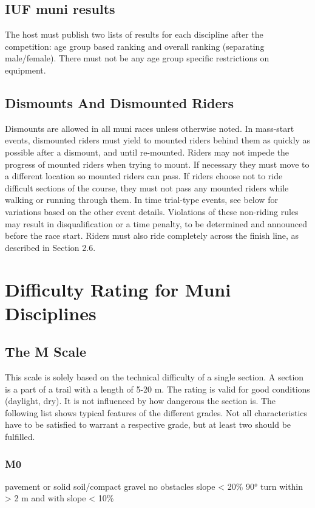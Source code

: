 \subsection{IUF muni results}
The host must publish two lists of results for each discipline after the
competition: age group based ranking and overall ranking (separating
male/female). There must not be any age group specific restrictions on
equipment.

\subsection{Dismounts And Dismounted Riders}
Dismounts are allowed in all muni races unless otherwise noted. In mass-start
events, dismounted riders must yield to mounted riders behind them as quickly as
possible after a dismount, and until re-mounted. Riders may not impede the
progress of mounted riders when trying to mount. If necessary they must move to
a different location so mounted riders can pass. If riders choose not to ride
difficult sections of the course, they must not pass any mounted riders while
walking or running through them. In time trial-type events, see below for
variations based on the other event details. Violations of these non-riding
rules may result in disqualification or a time penalty, to be determined and
announced before the race start. Riders must also ride completely across the
finish line, as described in Section 2.6. %

\section{Difficulty Rating for Muni Disciplines}

\subsection{The M Scale}

This scale is solely based on the technical difficulty of a single section. A
section is a part of a trail with a length of 5-20 m. The rating is valid for
good conditions (daylight, dry). It is not influenced by how dangerous the
section is. The following list shows typical features of the different grades.
Not all characteristics have to be satisfied to warrant a respective grade, but
at least two should be fulfilled.

\subsubsection{M0}
pavement or solid soil/compact gravel
no obstacles
slope < 20\%
90° turn within > 2 m and with slope < 10\%

